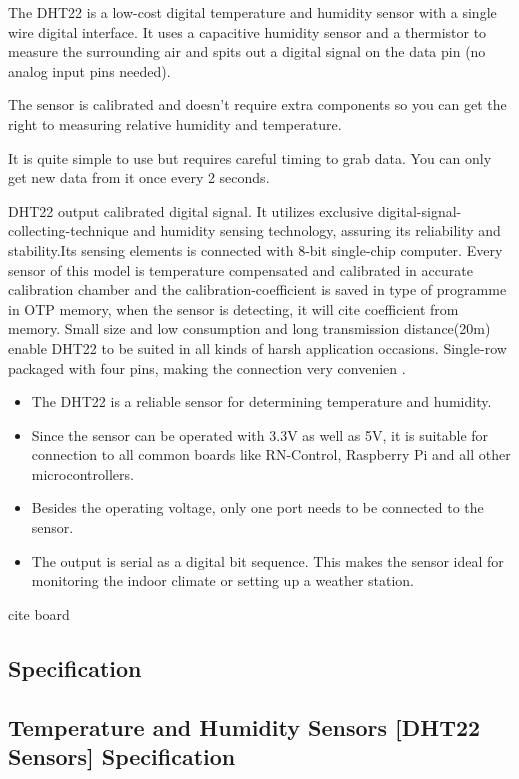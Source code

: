The DHT22 \cite{Jayetileke:2023} is a low-cost digital temperature and humidity sensor with a single wire digital interface. It uses a capacitive humidity sensor and a thermistor to measure the surrounding air and spits out a digital signal on the data pin (no analog input pins needed).

The sensor is calibrated and doesn’t require extra components so you can get the right to measuring relative humidity and temperature.

It is quite simple to use but requires careful timing to grab data. You can only get new data from it once every 2 seconds.

DHT22 \cite{Faroqi:2020} output calibrated digital signal. It utilizes exclusive digital-signal-collecting-technique and humidity sensing technology, assuring its reliability and stability.Its sensing elements is connected with 8-bit single-chip computer.
Every sensor of this model is temperature compensated and calibrated in accurate calibration chamber and the calibration-coefficient is saved in type of programme in OTP memory, when the sensor is detecting, it will cite coefficient from memory.
Small size and low consumption and long transmission distance(20m) enable DHT22 to be suited in all kinds of harsh application occasions.
Single-row packaged with four pins, making the connection very convenien \cite{Ahmad:2021}.

\begin{itemize}
	\item[\checkmark] The DHT22 is a reliable sensor for determining temperature and humidity.
	\item[\checkmark] Since the sensor can be operated with 3.3V as well as 5V, it is suitable for connection to all common boards like RN-Control, Raspberry Pi and all other microcontrollers.
	\item[\checkmark] Besides the operating voltage, only one port needs to be connected to the sensor. 
	\item[\checkmark] The output is serial as a digital bit sequence. This makes the sensor ideal for monitoring the indoor climate or setting up a weather station.
\end{itemize}



cite board

\subsection{Specification}
\subsection{Temperature and Humidity Sensors [DHT22 Sensors] Specification}

